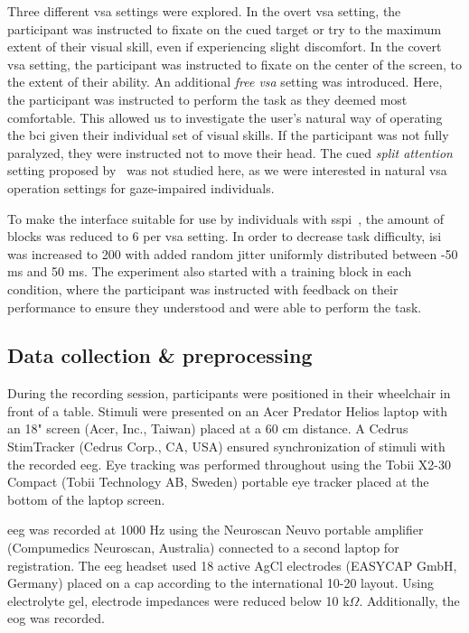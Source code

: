\documentclass[twocolumn]{article}
\begin{document}
Three different \ac{vsa} settings were explored.
In the overt \ac{vsa} setting, the participant was instructed to fixate on the cued target or
try to the maximum extent of their visual skill, even if experiencing slight
discomfort.
In the covert \ac{vsa} setting, the participant was instructed to fixate on the center of the
screen, to the extent of their ability.
An additional \emph{free \ac{vsa}} setting was introduced.
Here, the participant was instructed to perform the task as they deemed most
comfortable.
This allowed us to investigate the user's natural way of operating the \ac{bci}
given their individual set of visual skills.
If the participant was not fully paralyzed, they were instructed not to move their head.
The cued \emph{split attention} setting proposed
by~\textcite{VanDenKerchove2024} was not studied here, as we were interested
in natural \ac{vsa} operation settings for gaze-impaired individuals.

To make the interface suitable for use by individuals with
\ac{sspi}~\cite{FriedOken2020}, the amount of blocks was reduced to 6 per \ac{vsa} setting.
In order to decrease task difficulty, \ac{isi} was increased to 200 with added random jitter uniformly distributed
between -50 ms and 50 ms.
The experiment also started with a training block in each condition, where the
participant was instructed with feedback on their performance to ensure they
understood and were able to perform the task.


\subsection{Data collection \& preprocessing}

During the recording session, participants were positioned in their wheelchair in front of a table.
Stimuli were presented on an Acer Predator Helios laptop with an 18" screen (Acer,
Inc., Taiwan) placed at a 60 cm distance.
A Cedrus StimTracker (Cedrus Corp., CA, USA) ensured synchronization of stimuli with the
recorded \ac{eeg}.
Eye tracking was performed throughout using the Tobii X2-30 Compact (Tobii
Technology AB, Sweden) portable eye tracker placed at the bottom of the laptop screen.

\Ac{eeg} was recorded at 1000 Hz using the Neuroscan Neuvo portable amplifier (Compumedics Neuroscan,
Australia) connected to a second laptop for registration.
The \ac{eeg} headset used 18 active AgCl electrodes (EASYCAP GmbH, Germany) placed on a cap
according to the international 10-20 layout.
Using electrolyte gel, electrode impedances were reduced below 10 k$\Omega$.
Additionally, the \ac{eog} was recorded.
\end{document}
